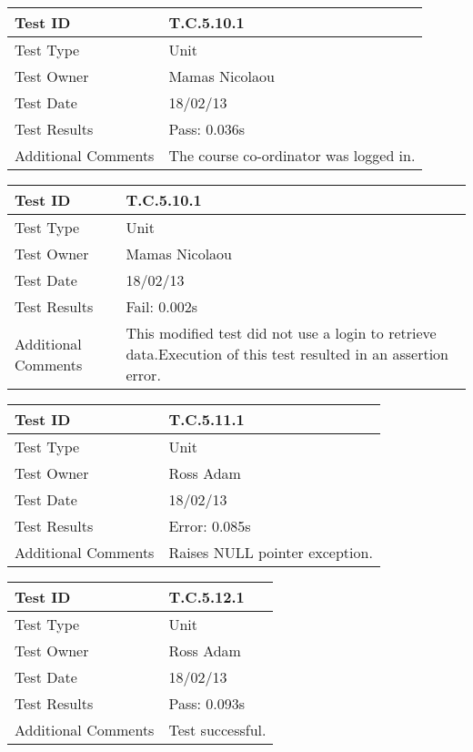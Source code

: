 \documentclass{l3deliverable}
\begin{document}
\vspace{4 mm}

\begin{tabular}{|p{2cm}|p{12cm}|}
\hline
Test ID & T.C.5.10.1\\
\hline
Test Type & Unit\\
\hline
Test Owner  & Mamas Nicolaou\\
\hline
Test Date & 18/02/13\\
\hline
Test Results & Pass: 0.036s\\
\hline
Additional Comments & The course co-ordinator was logged in.\\
\hline
\end{tabular}

\vspace{4 mm}

\begin{tabular}{|p{2cm}|p{12cm}|}
\hline
Test ID & T.C.5.10.1\\
\hline
Test Type & Unit\\
\hline
Test Owner  & Mamas Nicolaou\\
\hline
Test Date & 18/02/13\\
\hline
Test Results & Fail: 0.002s\\
\hline
Additional Comments & This modified test did not use a login to retrieve data.Execution of this test resulted in an assertion error.\\
\hline
\end{tabular}

\vspace{4 mm}

\begin{tabular}{|p{2cm}|p{12cm}|}
\hline
Test ID & T.C.5.11.1\\
\hline
Test Type & Unit\\
\hline
Test Owner  & Ross Adam\\
\hline
Test Date & 18/02/13\\
\hline
Test Results & Error: 0.085s\\
\hline
Additional Comments & Raises NULL pointer exception.\\
\hline
\end{tabular}

\vspace{4 mm}

\begin{tabular}{|p{2cm}|p{12cm}|}
\hline
Test ID & T.C.5.12.1\\
\hline
Test Type & Unit\\
\hline
Test Owner  & Ross Adam\\
\hline
Test Date & 18/02/13\\
\hline
Test Results & Pass: 0.093s\\
\hline
Additional Comments & Test successful.\\
\hline
\end{tabular}
\end{document}

